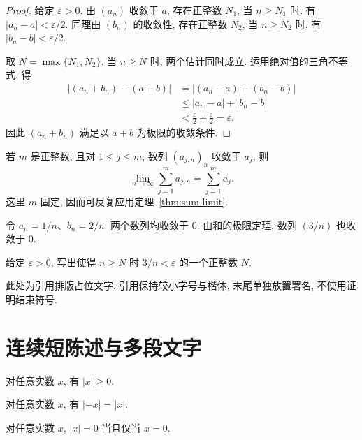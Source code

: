 \begin{proof}
    给定 $\varepsilon > 0$. 由 $(a_n)$ 收敛于 $a$, 存在正整数 $N_1$,
    当 $n \geq N_1$ 时, 有 $|a_n - a| < \varepsilon / 2$.
    同理由 $(b_n)$ 的收敛性, 存在正整数 $N_2$, 当 $n \geq N_2$ 时,
    有 $|b_n - b| < \varepsilon / 2$.

    取 $N = \max\{N_1, N_2\}$. 当 $n \geq N$ 时, 两个估计同时成立.
    运用绝对值的三角不等式, 得
    \begin{align*}
        |(a_n + b_n) - (a + b)|
        & = |(a_n - a) + (b_n - b)| \\
        & \leq |a_n - a| + |b_n - b| \\
        & < \frac{\varepsilon}{2} + \frac{\varepsilon}{2}
          = \varepsilon.
    \end{align*}
    因此 $(a_n + b_n)$ 满足以 $a + b$ 为极限的收敛条件.
\end{proof}
\SampleParagraph
\begin{corollary}[有限和]
    若 $m$ 是正整数, 且对 $1 \leq j \leq m$, 数列 $(a_{j,n})_n$
    收敛于 $a_j$, 则
    \[
        \lim_{n \to \infty} \sum_{j = 1}^{m} a_{j,n}
        = \sum_{j = 1}^{m} a_j.
    \]
    这里 $m$ 固定, 因而可反复应用定理~\ref{thm:sum-limit}.
\end{corollary}
\SampleParagraph
\begin{example}[两个简单数列]
    令 $a_n = 1 / n$、$b_n = 2 / n$. 两个数列均收敛于 $0$.
    由和的极限定理, 数列 $(3 / n)$ 也收敛于 $0$.
\end{example}
\begin{exercise}[按定义验证]
    给定 $\varepsilon > 0$, 写出使得 $n \geq N$ 时
    $3 / n < \varepsilon$ 的一个正整数 $N$.
\end{exercise}
\begin{quotationbox}
    此处为引用排版占位文字. 引用保持较小字号与楷体,
    末尾单独放置署名, 不使用证明结束符号.
\end{quotationbox}
\section{连续短陈述与多段文字}
\SampleParagraph
\begin{lemma}[非负性]
    对任意实数 $x$, 有 $|x| \geq 0$.
\end{lemma}
\begin{lemma}[对称性]
    对任意实数 $x$, 有 $|-x| = |x|$.
\end{lemma}
\begin{proposition}[零点]
    对任意实数 $x$, $|x| = 0$ 当且仅当 $x = 0$.
\end{proposition}
\SampleParagraph
\SampleParagraph
\SampleParagraph
\ifdefined\PaginationStress
